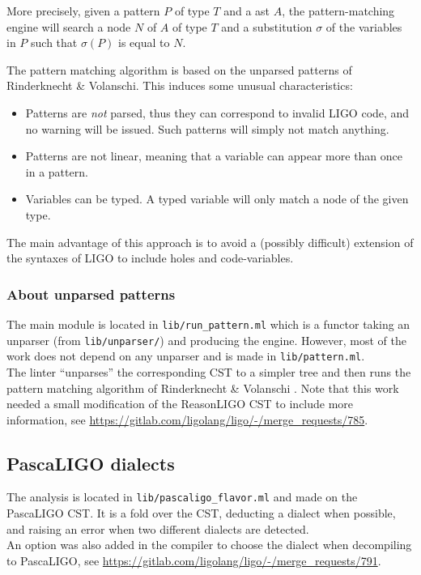 \documentclass[10pt,a4paper]{article}
\begin{document}
More precisely, given a pattern $P$ of type $T$ and a ast $A$, the pattern-matching engine will search a node $N$ of $A$ of type $T$ and a substitution $\sigma$ of the variables in $P$ such that $\sigma(P)$ is equal to $N$.

The pattern matching algorithm is based on the unparsed patterns of Rinderknecht \& Volanschi\cite{unparsedpatterns}. This induces some unusual characteristics:

\begin{itemize}
\item Patterns are \emph{not} parsed, thus they can correspond to invalid LIGO code, and no warning will be issued. Such patterns will simply not match anything.
\item Patterns are not linear, meaning that a variable can appear more than once in a pattern.
\item Variables can be typed. A typed variable will only match a node of the given type.
\end{itemize}

The main advantage of this approach is to avoid a (possibly difficult) extension of the syntaxes of LIGO to include holes and code-variables.

\subsubsection{About unparsed patterns}
The main module is located in \verb|lib/run_pattern.ml| which is a functor taking an unparser (from \verb|lib/unparser/|) and producing the engine. However, most of the work does not depend on any unparser and is made in \verb|lib/pattern.ml|.\\
The linter ``unparses'' the corresponding CST to a simpler tree and then runs the pattern matching algorithm of Rinderknecht \& Volanschi \cite{unparsedpatterns}.
Note that this work needed a small modification of the ReasonLIGO CST to include more information, see \url{https://gitlab.com/ligolang/ligo/-/merge_requests/785}.

\subsection{PascaLIGO dialects}
The analysis is located in \verb|lib/pascaligo_flavor.ml| and made on the PascaLIGO CST. It is a fold over the CST, deducting a dialect when possible, and raising an error when two different dialects are detected.\\
An option was also added in the compiler to choose the dialect when decompiling to PascaLIGO, see \url{https://gitlab.com/ligolang/ligo/-/merge_requests/791}.
\end{document}
